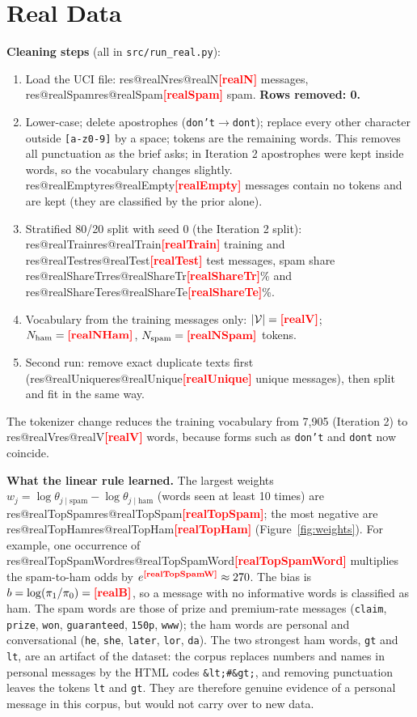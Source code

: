 \documentclass[11pt]{article}
\makeatletter
\newcommand{\fillin}[1]{\textcolor{red}{\textbf{[#1]}}}
\newcommand{\res}[1]{\ifcsname res@#1\endcsname\csname res@#1\endcsname\else\fillin{#1}\fi}
\theoremstyle{plain}
\newcommand{\Vs}{|\mathcal{V}|}
\makeatother
\begin{document}
\section{Real Data}\label{sec:real}
\textbf{Cleaning steps} (all in \texttt{src/run\_real.py}):
\begin{enumerate}[leftmargin=*,itemsep=1pt]
\item Load the UCI file: \res{realN} messages, \res{realSpam} spam. \textbf{Rows removed: 0.}
\item Lower-case; delete apostrophes (\texttt{don't}$\to$\texttt{dont}); replace every other character
outside \texttt{[a-z0-9]} by a space; tokens are the remaining words. This removes all punctuation as
the brief asks; in Iteration 2 apostrophes were kept inside words, so the vocabulary changes slightly.
\res{realEmpty} messages contain no tokens and are kept (they are classified by the prior alone).
\item Stratified 80/20 split with seed 0 (the Iteration 2 split): \res{realTrain} training and
\res{realTest} test messages, spam share \res{realShareTr}\% and \res{realShareTe}\%.
\item Vocabulary from the training messages only: $\Vs=\res{realV}$; $N_{\text{ham}}=\res{realNHam}$,
$N_{\text{spam}}=\res{realNSpam}$ tokens.
\item Second run: remove exact duplicate texts first (\res{realUnique} unique messages), then split
and fit in the same way.
\end{enumerate}

The tokenizer change reduces the training vocabulary from 7{,}905 (Iteration 2) to \res{realV}
words, because forms such as \texttt{don't} and \texttt{dont} now coincide.

\textbf{What the linear rule learned.} The largest weights $w_j=\log\theta_{j\mid\text{spam}}-\log\theta_{j\mid\text{ham}}$
(words seen at least 10 times) are \res{realTopSpam}; the most negative are \res{realTopHam}
(Figure~\ref{fig:weights}). For example, one occurrence of \res{realTopSpamWord} multiplies the
spam-to-ham odds by $e^{\res{realTopSpamW}}\approx 270$. The bias is $b=\log(\pi_1/\pi_0)=\res{realB}$,
so a message with no informative words is classified as ham. The spam words are those of prize and
premium-rate messages (\texttt{claim}, \texttt{prize}, \texttt{won}, \texttt{guaranteed}, \texttt{150p},
\texttt{www}); the ham words are personal and conversational (\texttt{he}, \texttt{she}, \texttt{later},
\texttt{lor}, \texttt{da}). The two strongest ham words, \texttt{gt} and \texttt{lt}, are an artifact
of the dataset: the corpus replaces numbers and names in personal messages by the HTML codes
\texttt{\&lt;\#\&gt;}, and removing punctuation leaves the tokens \texttt{lt} and \texttt{gt}. They
are therefore genuine evidence of a personal message in this corpus, but would not carry over to new data.
\end{document}

